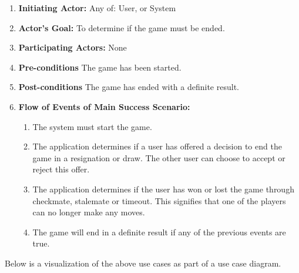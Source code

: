 \documentclass[]{article}
\begin{document}
\begin{enumerate}[{UC}1.]
\begin{enumerate}[{ }]
            \item \textbf{Initiating Actor:} 
                Any of: User, or System

            \item \textbf{Actor's Goal:} 
                To determine if the game must be ended.
            
            \item \textbf{Participating Actors:} 
                None
            
            \item \textbf{Pre-conditions}
                The game has been started.
                
            \item \textbf{Post-conditions}
                The game has ended with a definite result.
                
            \item \textbf{Flow of Events of Main Success Scenario:}
               \begin{enumerate}
                    \item The system must start the game.
                    \item The application determines if a user has offered a decision to end the game in a resignation or draw. The other user can choose to accept or reject this offer.
                    \item The application determines if the user has won or lost the game through checkmate, stalemate or timeout. This signifies that one of the players can no longer make any moves.
                    \item The game will end in a definite result if any of the previous events are true.
                \end{enumerate}
        \end{enumerate}
\end{enumerate}

\bigskip
Below is a visualization of the above use cases as part of a use case diagram.
\medskip
\end{document}

